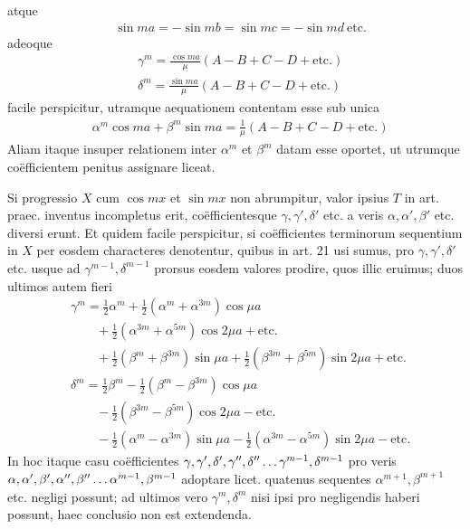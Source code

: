 atque
\[
\begin{aligned}
&\sin ma=-\sin mb=\sin mc=-\sin md\ \mathrm{etc.}
\end{aligned}
\]
adeoque
\[
\begin{aligned}
&\gamma^m=\frac{\cos ma}{\mu}(A-B+C-D+\mathrm{etc.})\\[5pt]
&\delta^m=\frac{\sin ma}{\mu}(A-B+C-D+\mathrm{etc.})
\end{aligned}
\]
facile perspicitur, utramque aequationem contentam esse sub unica
\[
\begin{aligned}
&\alpha^m\cos ma+\beta^m\sin ma=\frac1\mu(A-B+C-D+\mathrm{etc.})
\end{aligned}
\]
Aliam itaque insuper relationem inter $\alpha^m$ et $\beta^m$ datam esse oportet, ut utrumque co\"efficientem penitus assignare liceat.

Si progressio $X$ cum $\cos mx$ et $\sin mx$ non abrumpitur, valor ipsius $T$
in art. praec. inventus incompletus erit, co\"efficientesque $\gamma,\gamma',\delta'$ etc. a veris
$\alpha,\alpha',\beta'$ etc. diversi erunt. Et quidem facile perspicitur, si co\"efficientes terminorum sequentium in $X$ per eosdem characteres denotentur, quibus in art. 21
usi sumus, pro $\gamma,\gamma',\delta'$ etc. usque ad $\gamma^{m-1},\delta^{m-1}$ prorsus eosdem valores prodire,
quos illic eruimus; duos ultimos autem fieri
\[
\begin{aligned}
&\gamma^m=\frac12\alpha^m+\frac12(\alpha^m+\alpha^{3m})\cos\mu a\\[5pt]&\qquad{}+\frac12(\alpha^{3m}+\alpha^{5m})\cos2\mu a+\mathrm{etc.}\\[5pt]
&\qquad +\frac12(\beta^m+\beta^{3m})\sin\mu a+\frac12(\beta^{3m}+\beta^{5m})\sin2\mu a+\mathrm{etc.}\\[5pt]
&\delta^m=\frac12\beta^m-\frac12(\beta^m-\beta^{3m})\cos\mu a\\[5pt]&\qquad{}-\frac12(\beta^{3m}-\beta^{5m})\cos2\mu a-\mathrm{etc.}\\[5pt]
&\qquad -\frac12(\alpha^m-\alpha^{3m})\sin\mu a-\frac12(\alpha^{3m}-\alpha^{5m})\sin2\mu a-\mathrm{etc.}
\end{aligned}
\]
In hoc itaque casu co\"efficientes $\gamma,\gamma',\delta',\gamma'',\delta''\mathinner{.\,.\,.}\gamma^{m-1},\delta^{m-1}$ pro veris
$\alpha,\alpha',\beta',\alpha'',\beta''\mathinner{.\,.\,.}\alpha^{m-1},\beta^{m-1}$ adoptare licet. quatenus sequentes $\alpha^{m+1},\beta^{m+1}$ etc.
negligi possunt; ad ultimos vero $\gamma^m,\delta^m$ nisi ipsi pro negligendis haberi possunt,
haec conclusio non est extendenda.

